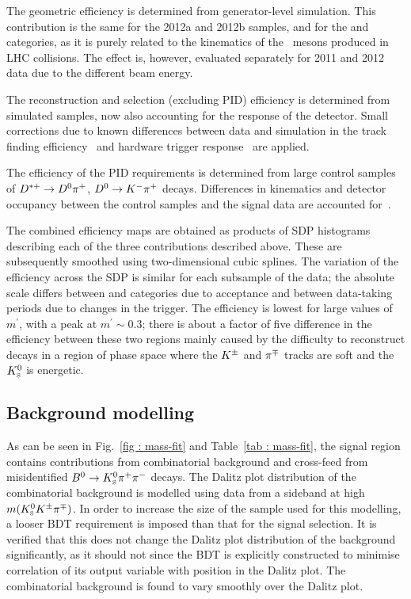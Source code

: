 The geometric efficiency is determined from generator-level simulation.
This contribution is the same for the 2012a and 2012b samples, and for the \LL and \DD categories, as it is purely related to the kinematics of the \Bs\ mesons produced in LHC collisions.
The effect is, however, evaluated separately for 2011 and 2012 data due to the different beam energy.

The reconstruction and selection (excluding PID) efficiency is determined from simulated samples, now also accounting for the response of the detector.
Small corrections due to known differences between data and simulation in the track finding efficiency~\cite{DeCian:1402577} and hardware trigger response~\cite{MartinSanchez:1407893} are applied.

The efficiency of the PID requirements is determined from large control samples of ${{D}^{*+}} \rightarrow {\ensuremath{{D}^0}} {\ensuremath{{\pi}^+}}$, ${{D}^0} \rightarrow {\ensuremath{{K}^-}}{\ensuremath{{\pi}^+}}$ decays.
Differences in kinematics and detector occupancy between the control samples and the signal data are accounted for~\cite{LHCb-DP-2012-003,LHCb-PUB-2016-021}.

The combined efficiency maps are obtained as products of SDP histograms describing each of the three contributions described above.
These are subsequently smoothed using two-dimensional cubic splines.
The variation of the efficiency across the SDP is similar for each subsample of the data; the absolute scale differs between \LL and \DD categories due to acceptance and between data-taking periods due to changes in the trigger.
The efficiency is lowest for large values of $m^{\prime}$, with a peak at $m^{\prime} \sim 0.3$; there is about a factor of five difference in the efficiency between these two regions mainly caused by the difficulty to reconstruct decays in a region of phase space where the ${{K}^\pm}$ and ${{\pi}^\mp}$ tracks are soft and the ${{K}^0_{\mathrm{ \scriptscriptstyle S}}}$ is energetic.

\subsection{Background modelling}

As can be seen in Fig.~\ref{fig : mass-fit} and Table~\ref{tab : mass-fit}, the signal region contains contributions from combinatorial background and cross-feed from misidentified ${{B}^0}\rightarrow{\ensuremath{{K}^0_{\mathrm{ \scriptscriptstyle S}}}}{\ensuremath{{\pi}^+}}{\ensuremath{{\pi}^-}}$ decays.
The Dalitz plot distribution of the combinatorial background is modelled using data from a sideband at high $m({{K}^0_{\mathrm{ \scriptscriptstyle S}}}{{K}^\pm}{{\pi}^\mp})$. %
In order to increase the size of the sample used for this modelling, a looser BDT requirement is imposed than that for the signal selection.
It is verified that this does not change the Dalitz plot distribution of the background significantly, as it should not since the BDT is explicitly constructed to minimise correlation of its output variable with position in the Dalitz plot.
The combinatorial background is found to vary smoothly over the Dalitz plot.

